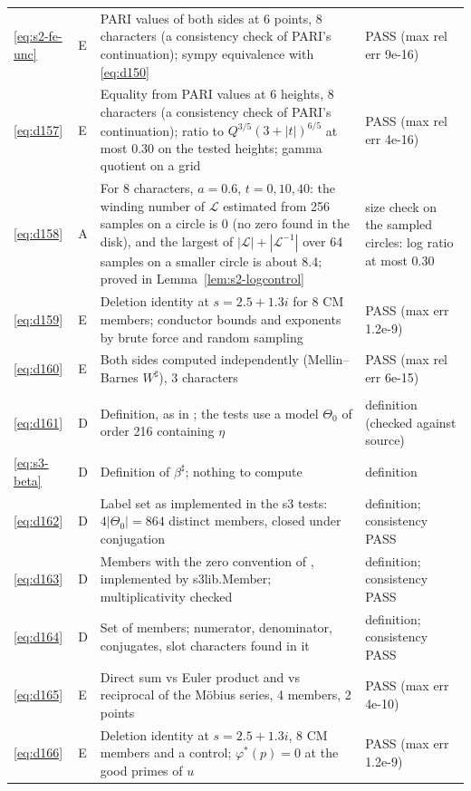 \documentclass[11pt]{article}
\numberwithin{equation}{section}
\begin{document}
\begin{longtable}{@{}>{\raggedright\arraybackslash}p{1.2cm}>{\centering\arraybackslash}p{0.7cm}>{\raggedright\arraybackslash}p{9.05cm}>{\raggedright\arraybackslash}p{4.3cm}@{}}
\eqref{eq:s2-fe-unc} & E & PARI values of both sides at 6 points, 8 characters (a consistency check of PARI's continuation); sympy equivalence with \eqref{eq:d150} & PASS (max rel err 9e-16)\\
\eqref{eq:d157} & E & Equality from PARI values at 6 heights, 8 characters (a consistency check of PARI's continuation); ratio to $Q^{3/5}(3+|t|)^{6/5}$ at most 0.30 on the tested heights; gamma quotient on a grid & PASS (max rel err 4e-16)\\
\eqref{eq:d158} & A & For 8 characters, $a=0.6$, $t=0,10,40$: the winding number of $\mathcal L$ estimated from 256 samples on a circle is 0 (no zero found in the disk), and the largest of $|\mathcal L|+|\mathcal L^{-1}|$ over 64 samples on a smaller circle is about 8.4; proved in Lemma~\ref{lem:s2-logcontrol} & size check on the sampled circles: log ratio at most 0.30\\
\eqref{eq:d159} & E & Deletion identity at $s=2.5+1.3i$ for 8 CM members; conductor bounds and exponents by brute force and random sampling & PASS (max err 1.2e-9)\\
\eqref{eq:d160} & E & Both sides computed independently (Mellin--Barnes $W^\sharp$), 3 characters & PASS (max rel err 6e-15)\\
\multicolumn{4}{@{}l}{\emph{Appendix~D}}\\
\eqref{eq:d161} & D & Definition, as in \cite{OAI78}; the tests use a model $\Theta_0$ of order 216 containing $\eta$ & definition (checked against source)\\
\eqref{eq:s3-beta} & D & Definition of $\beta^\sharp$; nothing to compute & definition\\
\eqref{eq:d162} & D & Label set as implemented in the s3 tests: $4|\Theta_0|=864$ distinct members, closed under conjugation & definition; consistency PASS\\
\eqref{eq:d163} & D & Members with the zero convention of \cite{OAI78}, implemented by s3lib.Member; multiplicativity checked & definition; consistency PASS\\
\eqref{eq:d164} & D & Set of members; numerator, denominator, conjugates, slot characters found in it & definition; consistency PASS\\
\eqref{eq:d165} & E & Direct sum vs Euler product and vs reciprocal of the M\"obius series, 4 members, 2 points & PASS (max err 4e-10)\\
\eqref{eq:d166} & E & Deletion identity at $s=2.5+1.3i$, 8 CM members and a control; $\varphi^*(p)=0$ at the good primes of $u$ & PASS (max err 1.2e-9)\\

\end{longtable}
\end{document}
